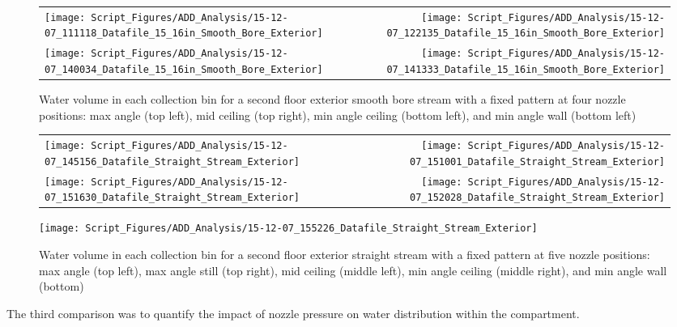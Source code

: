 \documentclass{article}
\begin{document}
\begin{figure}[ht]
\begin{tabular*}{\textwidth}{lr}
\texttt{[image: Script\_Figures/ADD\_Analysis/15-12-07\_111118\_Datafile\_15\_16in\_Smooth\_Bore\_Exterior]} &
\texttt{[image: Script\_Figures/ADD\_Analysis/15-12-07\_122135\_Datafile\_15\_16in\_Smooth\_Bore\_Exterior]} \\
\texttt{[image: Script\_Figures/ADD\_Analysis/15-12-07\_140034\_Datafile\_15\_16in\_Smooth\_Bore\_Exterior]} &
\texttt{[image: Script\_Figures/ADD\_Analysis/15-12-07\_141333\_Datafile\_15\_16in\_Smooth\_Bore\_Exterior]} \\
\end{tabular*}
\caption{Water volume in each collection bin for a second floor exterior smooth bore stream with a fixed pattern at four nozzle positions: max angle (top left), mid ceiling (top right), min angle ceiling (bottom left), and min angle wall (bottom left)}
\label{fig:Exterior_Second_Floor_Varying_Nozzle_Directions_SB_Fixed_Pattern}
\end{figure}

\begin{figure}[ht]
\begin{tabular*}{\textwidth}{lr}
\texttt{[image: Script\_Figures/ADD\_Analysis/15-12-07\_145156\_Datafile\_Straight\_Stream\_Exterior]} &
\texttt{[image: Script\_Figures/ADD\_Analysis/15-12-07\_151001\_Datafile\_Straight\_Stream\_Exterior]} \\
\texttt{[image: Script\_Figures/ADD\_Analysis/15-12-07\_151630\_Datafile\_Straight\_Stream\_Exterior]} &
\texttt{[image: Script\_Figures/ADD\_Analysis/15-12-07\_152028\_Datafile\_Straight\_Stream\_Exterior]} \\
\end{tabular*}
\centering
\texttt{[image: Script\_Figures/ADD\_Analysis/15-12-07\_155226\_Datafile\_Straight\_Stream\_Exterior]} \\
\caption{Water volume in each collection bin for a second floor exterior straight stream with a fixed pattern at five nozzle positions: max angle (top left), max angle still (top right), mid ceiling (middle left), min angle ceiling (middle right), and min angle wall (bottom)}
\label{fig:Exterior_Second_Floor_Varying_Nozzle_Directions_SS_Fixed_Pattern}
\end{figure}


\clearpage

The third comparison was to quantify the impact of nozzle pressure on water distribution within the compartment.
\end{document}

